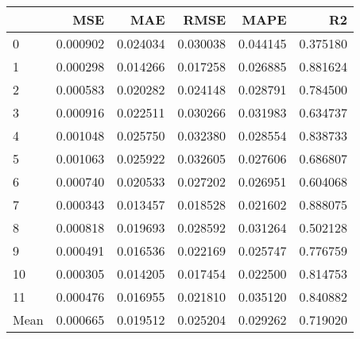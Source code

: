 \begin{tabular}{lrrrrr}
\toprule
 & MSE & MAE & RMSE & MAPE & R2 \\
\midrule
0 & 0.000902 & 0.024034 & 0.030038 & 0.044145 & 0.375180 \\
1 & 0.000298 & 0.014266 & 0.017258 & 0.026885 & 0.881624 \\
2 & 0.000583 & 0.020282 & 0.024148 & 0.028791 & 0.784500 \\
3 & 0.000916 & 0.022511 & 0.030266 & 0.031983 & 0.634737 \\
4 & 0.001048 & 0.025750 & 0.032380 & 0.028554 & 0.838733 \\
5 & 0.001063 & 0.025922 & 0.032605 & 0.027606 & 0.686807 \\
6 & 0.000740 & 0.020533 & 0.027202 & 0.026951 & 0.604068 \\
7 & 0.000343 & 0.013457 & 0.018528 & 0.021602 & 0.888075 \\
8 & 0.000818 & 0.019693 & 0.028592 & 0.031264 & 0.502128 \\
9 & 0.000491 & 0.016536 & 0.022169 & 0.025747 & 0.776759 \\
10 & 0.000305 & 0.014205 & 0.017454 & 0.022500 & 0.814753 \\
11 & 0.000476 & 0.016955 & 0.021810 & 0.035120 & 0.840882 \\
Mean & 0.000665 & 0.019512 & 0.025204 & 0.029262 & 0.719020 \\
\bottomrule
\end{tabular}
